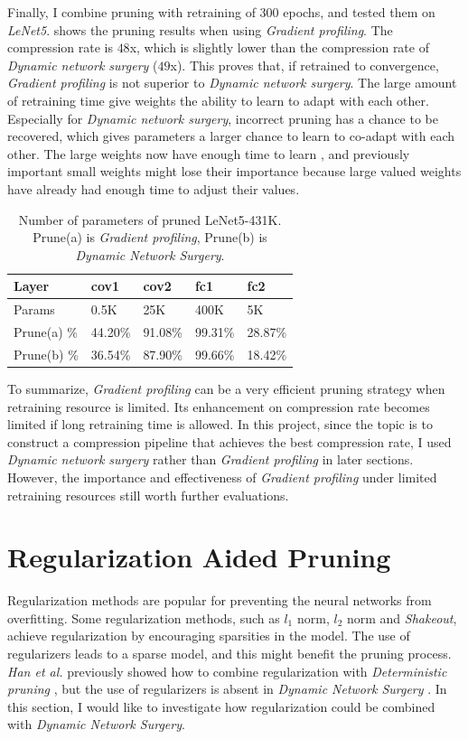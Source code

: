 \documentclass[a4paper,12pt]{report}
\begin{document}
Finally, I combine pruning with retraining of 300 epochs, and tested them
on \textit{LeNet5}.
 shows the pruning results when using \textit{Gradient profiling}.
The compression rate is $48$x, which is slightly lower than the compression rate
of \textit{Dynamic network surgery} ($49$x).
This proves that, if retrained to convergence, \textit{Gradient profiling} is not
superior to \textit{Dynamic network surgery}.
The large amount of retraining time give weights the ability to learn to adapt with
each other.
Especially for \textit{Dynamic network surgery}, incorrect pruning has a chance
to be recovered, which gives parameters a larger chance to learn to co-adapt with
each other.
The large weights now have enough time to learn , and
previously important small weights might lose their importance because large valued
weights have already had enough time to adjust their values.
\begin{table}[!h]
\centering
\begin{tabular}{|l|l|l|l|l|}
\hline
Layer			&cov1	&cov2	&fc1	&fc2 		\\ \hline
Params		& 0.5K		&25K	&400K	&5K		\\
\hline
Prune(a) \%	&  44.20\%		&91.08\%	&99.31\%	&28.87\%	 \\
\hline
Prune(b) \%	& 36.54\%		&87.90\%	&99.66\%	&18.42\%	 \\
\hline
\end{tabular}
\caption{Number of parameters of pruned LeNet5-431K.
Prune(a) is \textit{Gradient profiling}, Prune(b) is \textit{Dynamic Network Surgery}.}
\label{tab:LeNetPrunegp}
\end{table}

To summarize, \textit{Gradient profiling} can be a very efficient pruning strategy
when retraining resource is limited.
Its enhancement on compression rate becomes limited if long retraining time is allowed.
In this project, since the topic is to construct a compression pipeline that achieves
the best compression rate, I used \textit{Dynamic network surgery} rather than
\textit{Gradient profiling} in later sections.
However, the importance and effectiveness of \textit{Gradient profiling} under
limited retraining resources still worth further evaluations.

\section{Regularization Aided Pruning}
Regularization methods are popular for preventing the neural networks from
overfitting.
Some regularization methods, such as $l_1$ norm, $l_2$ norm and \textit{Shakeout},
achieve regularization by encouraging sparsities in the model.
The use of regularizers leads to a sparse model, and this might benefit the pruning
process.
\textit{Han et al.} previously showed how to combine regularization with
\textit{Deterministic pruning} \cite{Han}, but the use of regularizers is absent
in \textit{Dynamic Network Surgery} \cite{Guo}.
In this section, I would like to investigate how regularization could
be combined with \textit{Dynamic Network Surgery}.
\end{document}
